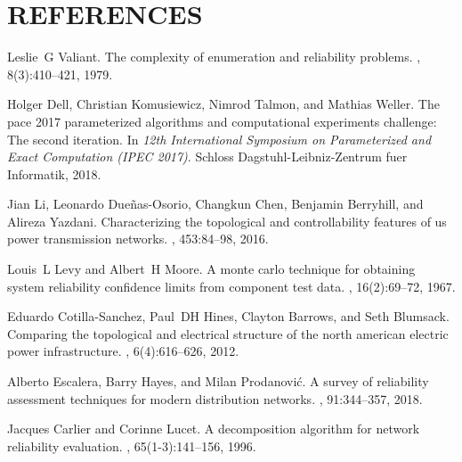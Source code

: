 \documentclass[12pt,twocolumn]{article}
\begin{document}


\newpage
\clearpage
\section{REFERENCES}
{\small
\begin{thebibliography}{10}

Leslie~G Valiant.
\newblock The complexity of enumeration and reliability problems.
, 8(3):410--421, 1979.

Holger Dell, Christian Komusiewicz, Nimrod Talmon, and Mathias Weller.
\newblock The pace 2017 parameterized algorithms and computational experiments
  challenge: The second iteration.
\newblock In {\em 12th International Symposium on Parameterized and Exact
  Computation (IPEC 2017)}. Schloss Dagstuhl-Leibniz-Zentrum fuer Informatik,
  2018.

Jian Li, Leonardo Due{\~n}as-Osorio, Changkun Chen, Benjamin Berryhill, and
  Alireza Yazdani.
\newblock Characterizing the topological and controllability features of us
  power transmission networks.
,
  453:84--98, 2016.

Louis~L Levy and Albert~H Moore.
\newblock A monte carlo technique for obtaining system reliability confidence
  limits from component test data.
, 16(2):69--72, 1967.

Eduardo Cotilla-Sanchez, Paul~DH Hines, Clayton Barrows, and Seth Blumsack.
\newblock Comparing the topological and electrical structure of the north
  american electric power infrastructure.
, 6(4):616--626, 2012.

Alberto Escalera, Barry Hayes, and Milan Prodanovi{\'c}.
\newblock A survey of reliability assessment techniques for modern distribution
  networks.
, 91:344--357, 2018.

Jacques Carlier and Corinne Lucet.
\newblock A decomposition algorithm for network reliability evaluation.
, 65(1-3):141--156, 1996.


\end{thebibliography}}
\end{document}
